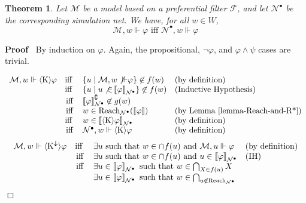 \documentclass{article}
\newcommand{\infixiff}{\text{ iff }}
\newcommand{\nin}{\not\in}
\newcommand{\tmmathbf}[1]{\ensuremath{\boldsymbol{#1}}}
\newcommand{\tmop}[1]{\ensuremath{\operatorname{#1}}}
\newcommand{\tmtextbf}[1]{\text{{\bfseries{#1}}}}
\newenvironment{proof}{\noindent\textbf{Proof\ }}{\hspace*{\fill}$\Box$\medskip}
\newtheorem{theorem}{Theorem}
\providecommand{\infixiff}{\mathbin{\text{ iff }}}
\newcommand{\Model}{\ensuremath{\mathcal{M}}}
\newcommand{\Net}{\ensuremath{\mathcal{N}}}
\newcommand{\semantics}[1]{\left\llbracket #1 \right\rrbracket}
\newcommand{\diaKnow}{\langle \tmmathbf{\text{K}} \rangle}
\newcommand{\diaKnownby}{\langle \tmmathbf{\text{K}^{\downarrow}} \rangle}
\newcommand{\Reach}{\textsf{\tmop{Reach}}}
\begin{document}
\begin{theorem}
  \label{frame-to-net}Let $\Model$ be a model based on a preferential filter
  $\mathcal{F}$, and let $\Net^{\bullet}$ be the corresponding simulation net.
  We have, for all $w \in W$,
  \[ \Model, w \Vdash \varphi \infixiff \Net^{\bullet}, w \Vdash \varphi \]
\end{theorem}

\begin{proof}
  By induction on $\varphi$. Again, the propositional, $\neg \varphi$, and
  $\varphi \wedge \psi$ cases are trivial.
  \begin{description}
    \tmtextbf{}\tmtextbf{$\diaKnow \varphi$ case:}
    \[ \begin{array}{lcll}
         \Model, w \Vdash \diaKnow \varphi & \text{iff } & \left\{ u \mid
         \Model, w \not{\Vdash} \varphi \right\} \nin f (w) & \text{(by
         definition)}\\
         & \text{iff } & \left\{ u \mid u \not{\in}
         \semantics{\varphi}_{\Net^{\bullet}} \right\}  \nin f (w) &
         \text{(Inductive Hypothesis)}\\
         & \tmop{iff} & \semantics{\varphi}_{\Net^{\bullet}}^{\complement}
         \nin g (w) & \\
         & \tmop{iff} & w \in \Reach_{\Net^{\bullet}} (\semantics{\varphi}) &
         \text{(by Lemma \ref{lemma-Reach-and-R*})}\\
         & \text{iff } & w \in \semantics{\diaKnow \varphi}_{\Net^{\bullet}}
         & \text{(by definition)}\\
         & \tmop{iff} & \Net^{\bullet}, w \Vdash \diaKnow \varphi & \text{(by
         definition)}
       \end{array} \]
    \tmtextbf{$\diaKnownby \varphi$ case:}
    \[ \begin{array}{lcll}
         \Model, w \Vdash \diaKnownby \varphi & \text{iff } & \exists u \text{
         such that } w \in \cap f (u) \text{ and } \Model, u \Vdash \varphi &
         \text{(by definition)}\\
         & \tmop{iff} & \exists u \text{ such that } w \in \cap f (u) \text{
         and } u \in \semantics{\varphi}_{\Net^{\bullet}} & \text{(IH)}\\
         & \tmop{iff} & \exists u \in \semantics{\varphi}_{\Net^{\bullet}}
         \text{ such that } w \in \bigcap_{X \in f (u)} X & \\
         &  & \exists u \in \semantics{\varphi}_{\Net^{\bullet}} \text{ such
         that } w \in \bigcap_{u \not{\in} \Reach_{\Net^{\bullet}}
}
\end{array}\]
\end{description}
\end{proof}
\end{document}
